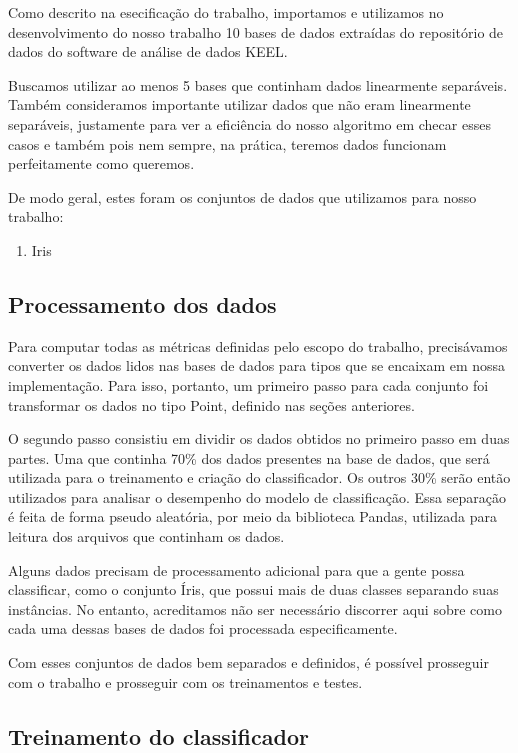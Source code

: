 \documentclass{article}
\begin{document}
Como descrito na esecificação do trabalho, importamos e utilizamos no desenvolvimento do nosso trabalho 10 bases de dados extraídas do repositório de dados do software de análise de dados KEEL.

Buscamos utilizar ao menos 5 bases que continham dados linearmente separáveis. Também consideramos importante utilizar dados que não eram linearmente separáveis, justamente para ver a eficiência do nosso algoritmo em checar esses casos e também pois nem sempre, na prática, teremos dados funcionam perfeitamente como queremos.

De modo geral, estes foram os conjuntos de dados que utilizamos para nosso trabalho:

\begin{enumerate}
    \item Iris
    
\end{enumerate}

\subsection{Processamento dos dados}

Para computar todas as métricas definidas pelo escopo do trabalho, precisávamos converter os dados lidos nas bases de dados para tipos que se encaixam em nossa implementação. Para isso, portanto, um primeiro passo para cada conjunto foi transformar os dados no tipo Point, definido nas seções anteriores.

O segundo passo consistiu em dividir os dados obtidos no primeiro passo em duas partes. Uma que continha 70\% dos dados presentes na base de dados, que será utilizada para o treinamento e criação do classificador. Os outros 30\% serão então utilizados para analisar o desempenho do modelo de classificação. Essa separação é feita de forma pseudo aleatória, por meio da biblioteca Pandas, utilizada para leitura dos arquivos que continham os dados. 

Alguns dados precisam de processamento adicional para que a gente possa classificar, como o conjunto Íris, que possui mais de duas classes separando suas instâncias. No entanto, acreditamos não ser necessário discorrer aqui sobre como cada uma dessas bases de dados foi processada especificamente.

Com esses conjuntos de dados bem separados e definidos, é possível prosseguir com o trabalho e prosseguir com os treinamentos e testes.

\subsection{Treinamento do classificador}
\end{document}
